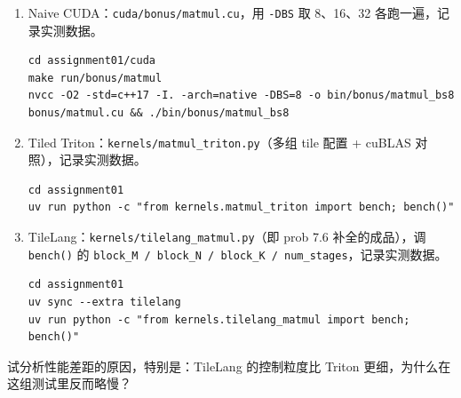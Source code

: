 \documentclass[11pt,a4paper,fontset=fandol]{ctexart}
\begin{document}
\begin{enumerate}[label=(\alph*)]
  \item Naive CUDA：\texttt{cuda/bonus/matmul.cu}，用 \texttt{-DBS} 取 8、16、32 各跑一遍，记录实测数据。
\begin{lstlisting}
cd assignment01/cuda
make run/bonus/matmul
nvcc -O2 -std=c++17 -I. -arch=native -DBS=8 -o bin/bonus/matmul_bs8 bonus/matmul.cu && ./bin/bonus/matmul_bs8
\end{lstlisting}
  \item Tiled Triton：\texttt{kernels/matmul\_triton.py}（多组 tile 配置 + cuBLAS 对照），记录实测数据。
\begin{lstlisting}
cd assignment01
uv run python -c "from kernels.matmul_triton import bench; bench()"
\end{lstlisting}
  \item TileLang：\texttt{kernels/tilelang\_matmul.py}（即 prob 7.6 补全的成品），调 \texttt{bench()} 的 \texttt{block\_M / block\_N / block\_K / num\_stages}，记录实测数据。
\begin{lstlisting}
cd assignment01
uv sync --extra tilelang
uv run python -c "from kernels.tilelang_matmul import bench; bench()"
\end{lstlisting}
\end{enumerate}

试分析性能差距的原因，特别是：TileLang 的控制粒度比 Triton 更细，为什么在这组测试里反而略慢？
\end{document}
